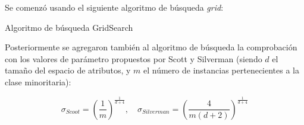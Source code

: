 Se comenzó usando el siguiente algoritmo de búsqueda \textit{grid}:

\begin{algorithm}[H]
\begin{algorithmic}[1]
    \ENDIF
  \ENDFOR
  \RETURN{$\sigma$}
\end{algorithmic}
\caption{Algoritmo de búsqueda GridSearch}
\end{algorithm}

Posteriormente se agregaron también al algoritmo de búsqueda la comprobación con los valores de parámetro propuestos por Scott
y Silverman (siendo $d$ el tamaño del espacio de atributos, y $m$ el número de instancias pertenecientes a la clase minoritaria):

\[\sigma_{Scoot} = \left(\frac{1}{m}\right)^{\frac{1}{d+4}}, \quad \sigma_{Silverman} = \left(\frac{4}{m(d+2)}\right)^{\frac{1}{d+4}}\]
